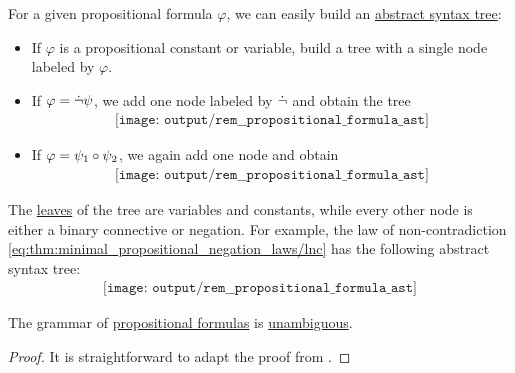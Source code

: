 \begin{remark}\label{rem:propositional_formula_ast}
  For a given propositional formula \( \varphi \), we can easily build an \hyperref[rem:abstract_syntax_tree]{abstract syntax tree}:
  \begin{itemize}
    \item If \( \varphi \) is a propositional constant or variable, build a tree with a single node labeled by \( \varphi \).
    \item If \( \varphi = \dot\neg \psi \), we add one node labeled by \( \dot\neg \) and obtain the tree
    \begin{equation*}
      \begin{aligned}
        \texttt{[image: output/rem\_\_propositional\_formula\_ast]}
      \end{aligned}
    \end{equation*}

    \item If \( \varphi = \psi_1 \bincirc \psi_2 \), we again add one node and obtain
    \begin{equation*}
      \begin{aligned}
        \texttt{[image: output/rem\_\_propositional\_formula\_ast]}
      \end{aligned}
    \end{equation*}
  \end{itemize}

  The \hyperref[def:rooted_tree/leaf]{leaves} of the tree are variables and constants, while every other node is either a binary connective or negation. For example, the law of non-contradiction \eqref{eq:thm:minimal_propositional_negation_laws/lnc} has the following abstract syntax tree:
  \begin{equation*}
    \begin{aligned}
      \texttt{[image: output/rem\_\_propositional\_formula\_ast]}
    \end{aligned}
  \end{equation*}
\end{remark}

\begin{proposition}\label{thm:propositional_formulas_are_unambiguous}
  The grammar of \hyperref[def:propositional_syntax/formula]{propositional formulas} is \hyperref[def:grammar_ambiguity]{unambiguous}.
\end{proposition}
\begin{proof}
  It is straightforward to adapt the proof from .
\end{proof}

